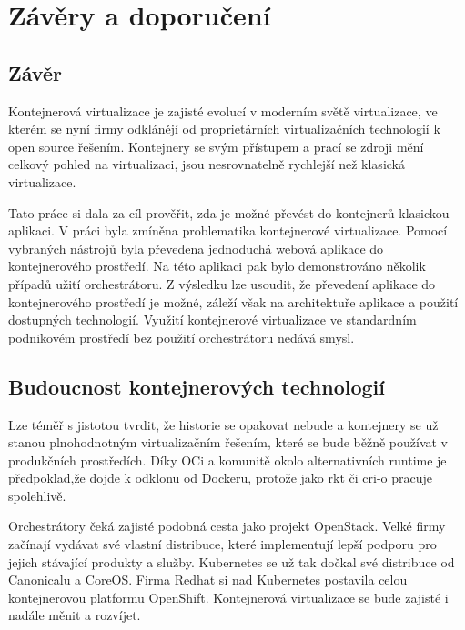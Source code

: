 \chapter{Závěry a doporučení}
\section{Závěr}
Kontejnerová virtualizace je zajisté evolucí v moderním světě virtualizace, ve kterém se nyní firmy odklánějí od proprietárních virtualizačních technologií k open source řešením. Kontejnery se svým  přístupem a prací se zdroji mění celkový pohled na virtualizaci, jsou nesrovnatelně rychlejší než klasická virtualizace.

Tato práce si dala za cíl prověřit, zda je možné převést do kontejnerů klasickou aplikaci. V práci byla zmíněna problematika kontejnerové virtualizace. Pomocí vybraných nástrojů byla převedena jednoduchá webová aplikace do kontejnerového prostředí. Na této aplikaci pak bylo demonstrováno několik případů užití orchestrátoru. Z výsledku lze usoudit, že převedení aplikace do kontejnerového prostředí je možné, záleží však na architektuře aplikace a použití dostupných technologií. Využití kontejnerové virtualizace ve standardním podnikovém prostředí bez použití orchestrátoru nedává smysl. 

\section{Budoucnost kontejnerových technologií}
Lze téměř s jistotou tvrdit, že historie se opakovat nebude a kontejnery se už stanou plnohodnotným virtualizačním řešením, které se bude běžně používat v produkčních prostředích. Díky OCi a komunitě okolo alternativních runtime je předpoklad,že  dojde k odklonu od Dockeru, protože jako rkt či cri-o pracuje spolehlivě.

Orchestrátory čeká zajisté podobná cesta jako projekt OpenStack. Velké firmy začínají vydávat své vlastní distribuce, které implementují lepší podporu pro jejich stávající produkty a služby. Kubernetes se už tak dočkal své distribuce od Canonicalu a CoreOS. Firma Redhat si nad Kubernetes postavila celou kontejnerovou platformu OpenShift. Kontejnerová virtualizace se bude zajisté i nadále měnit a rozvíjet.